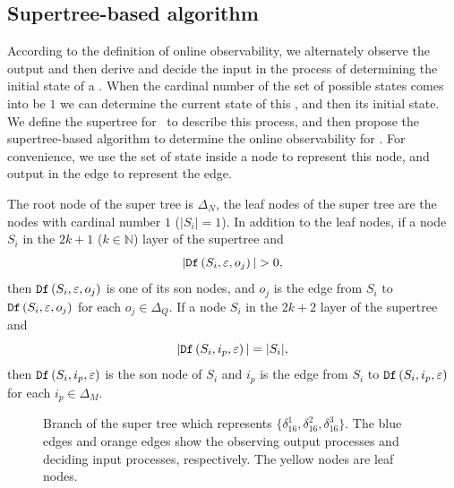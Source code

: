 \subsection{Supertree-based algorithm} %
According to the definition of online observability, we alternately observe the output and then derive and decide the input in the process of determining the initial state of a \BCN. When the  cardinal number of the set of possible states comes into be $1$ we can determine the current state of this \BCN, and then its initial state. We define the supertree for \BCNs\ to describe this process, and then propose the supertree-based algorithm to determine the online observability for \BCNs. For convenience, we use the set of state inside a node to represent this node, and output in the edge to represent the edge.
\begin{definition}
The root node of the super tree is $\Delta_N$, the leaf nodes of the super tree are the nodes with cardinal number $1$ ($|S_i|=1$). In addition to the leaf nodes, if a node $S_i$ in the $2k + 1$ ($k\in \mathbb{N}$) layer of the supertree and 
\[|\Ded\left(S_i,\varepsilon, o_j\right)|>0,\]
 then ${\tt Df}\left(S_i,\varepsilon, o_j\right)$ is one of its son nodes, and $o_j$ is the edge from $S_i$ to ${\tt Df}\left(S_i,\varepsilon, o_j\right)$ for each $o_j \in \Delta_Q$. If a node $S_i$ in the $2k+2$ layer of the supertree and  
\[|{\tt Df}\left(S_i,i_p,\varepsilon\right)|=|S_i|,\] 
then ${\tt Df}\left(S_i,i_p,\varepsilon\right)$ is the son node of $S_i$ and $i_p$ is the edge from $S_i$ to ${\tt Df}\left(S_i,i_p,\varepsilon\right)$ for each $i_p \in \Delta_M$. 
\label{def:super-tree}
\end{definition}

  \begin{figure}[thpb]
      \centering
      
      \caption{Branch of the super tree which represents $\{\delta_{16}^1,\delta_{16}^2,\delta_{16}^3\}$. The blue edges and orange edges show the observing output processes and deciding input processes, respectively. The yellow nodes are leaf nodes.}
      \label{fig:3}
   \end{figure}

